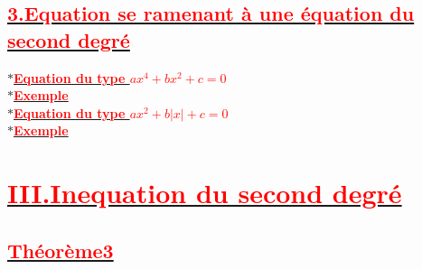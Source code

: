 \documentclass[12pt]{article}
\begin{document}
\subsection*{\underline{\textbf{\textcolor{red}{3.Equation se ramenant à une équation du second degré}}}}
$\ast$\underline{\textbf{\textcolor{red}{Equation du type $ax^{4}+bx^{2}+c=0$}}}\\
$\ast$\underline{\textbf{\textcolor{red}{Exemple}}}\\
$\ast$\underline{\textbf{\textcolor{red}{Equation du type $ax^{2}+b|x|+c=0$}}}\\
$\ast$\underline{\textbf{\textcolor{red}{Exemple}}}\\
\section*{\underline{\textbf{\textcolor{red}{III.Inequation du second degré}}}}
\subsection*{\underline{\textbf{\textcolor{red}{Théorème3}}}}
\end{document}
